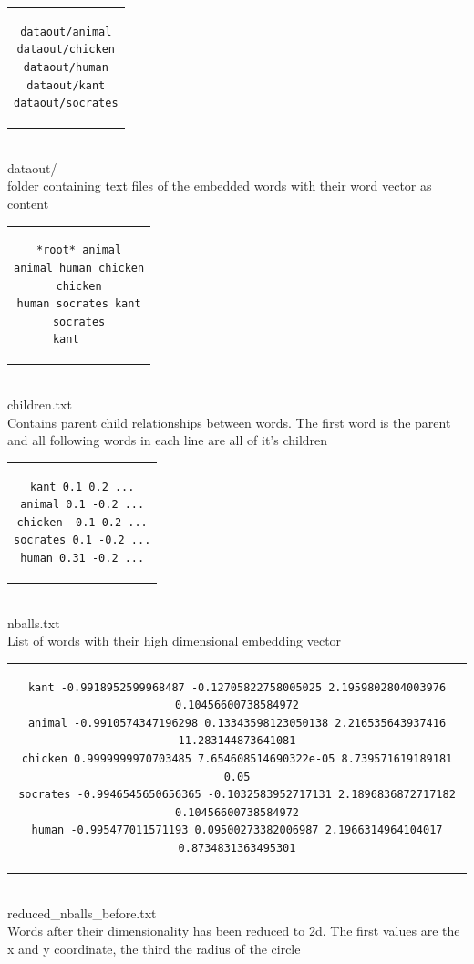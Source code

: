 \documentclass[]{article}
\begin{document}
\begin{center}

\begin{tabular}{c}
\begin{lstlisting}
dataout/animal
dataout/chicken
dataout/human
dataout/kant
dataout/socrates
\end{lstlisting}
\end{tabular}
\\dataout/\\
 folder containing text files of the embedded words with their word vector as content

\begin{tabular}{c}
\begin{lstlisting}
*root* animal
animal human chicken
chicken
human socrates kant
socrates
kant	
\end{lstlisting}
\end{tabular}
\\children.txt
\\Contains parent child relationships between words. The first word is the parent and all following words in each line are all of it's children

\begin{tabular}{c}
\begin{lstlisting}
kant 0.1 0.2 ...
animal 0.1 -0.2 ...
chicken -0.1 0.2 ...
socrates 0.1 -0.2 ...
human 0.31 -0.2 ...
\end{lstlisting}
\end{tabular}
\\nballs.txt
\\List of words with their high dimensional embedding vector

\begin{tabular}{c}
\begin{lstlisting}
kant -0.9918952599968487 -0.12705822758005025 2.1959802804003976 0.10456600738584972
animal -0.9910574347196298 0.13343598123050138 2.216535643937416 11.283144873641081
chicken 0.9999999970703485 7.654608514690322e-05 8.739571619189181 0.05
socrates -0.9946545650656365 -0.1032583952717131 2.1896836872717182 0.10456600738584972
human -0.995477011571193 0.09500273382006987 2.1966314964104017 0.8734831363495301
\end{lstlisting}
\end{tabular}
\\reduced\_nballs\_before.txt
\\Words after their dimensionality has been reduced to 2d. The first values are the x and y coordinate, the third the radius of the circle


\end{center}
\end{document}
